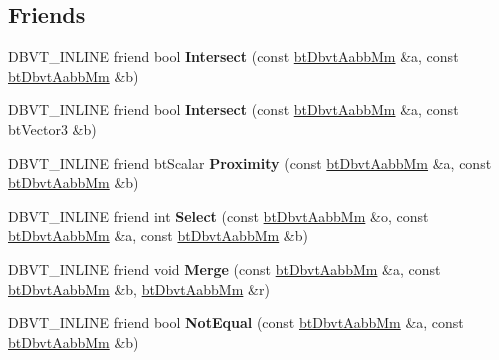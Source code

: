 \subsection*{Friends}
\begin{DoxyCompactItemize}
\item 
\mbox{\label{structbtDbvtAabbMm_a58901e7699bdc88aa0a4e7d6e1200156}} 
D\+B\+V\+T\+\_\+\+I\+N\+L\+I\+NE friend bool {\bfseries Intersect} (const \hyperlink{structbtDbvtAabbMm}{bt\+Dbvt\+Aabb\+Mm} \&a, const \hyperlink{structbtDbvtAabbMm}{bt\+Dbvt\+Aabb\+Mm} \&b)
\item 
\mbox{\label{structbtDbvtAabbMm_a908648b3fc05f022df71dc8809257253}} 
D\+B\+V\+T\+\_\+\+I\+N\+L\+I\+NE friend bool {\bfseries Intersect} (const \hyperlink{structbtDbvtAabbMm}{bt\+Dbvt\+Aabb\+Mm} \&a, const bt\+Vector3 \&b)
\item 
\mbox{\label{structbtDbvtAabbMm_ab07b0b13aaf7c4f84e4c5a603611602c}} 
D\+B\+V\+T\+\_\+\+I\+N\+L\+I\+NE friend bt\+Scalar {\bfseries Proximity} (const \hyperlink{structbtDbvtAabbMm}{bt\+Dbvt\+Aabb\+Mm} \&a, const \hyperlink{structbtDbvtAabbMm}{bt\+Dbvt\+Aabb\+Mm} \&b)
\item 
\mbox{\label{structbtDbvtAabbMm_a57d49ba44a56803bbd93cf591fa72ec9}} 
D\+B\+V\+T\+\_\+\+I\+N\+L\+I\+NE friend int {\bfseries Select} (const \hyperlink{structbtDbvtAabbMm}{bt\+Dbvt\+Aabb\+Mm} \&o, const \hyperlink{structbtDbvtAabbMm}{bt\+Dbvt\+Aabb\+Mm} \&a, const \hyperlink{structbtDbvtAabbMm}{bt\+Dbvt\+Aabb\+Mm} \&b)
\item 
\mbox{\label{structbtDbvtAabbMm_a6b632dafd4f19b6b91b766476c3ae43f}} 
D\+B\+V\+T\+\_\+\+I\+N\+L\+I\+NE friend void {\bfseries Merge} (const \hyperlink{structbtDbvtAabbMm}{bt\+Dbvt\+Aabb\+Mm} \&a, const \hyperlink{structbtDbvtAabbMm}{bt\+Dbvt\+Aabb\+Mm} \&b, \hyperlink{structbtDbvtAabbMm}{bt\+Dbvt\+Aabb\+Mm} \&r)
\item 
\mbox{\label{structbtDbvtAabbMm_a50a983887ecf866dda3b078b5164a331}} 
D\+B\+V\+T\+\_\+\+I\+N\+L\+I\+NE friend bool {\bfseries Not\+Equal} (const \hyperlink{structbtDbvtAabbMm}{bt\+Dbvt\+Aabb\+Mm} \&a, const \hyperlink{structbtDbvtAabbMm}{bt\+Dbvt\+Aabb\+Mm} \&b)
\item 

\end{DoxyCompactItemize}
